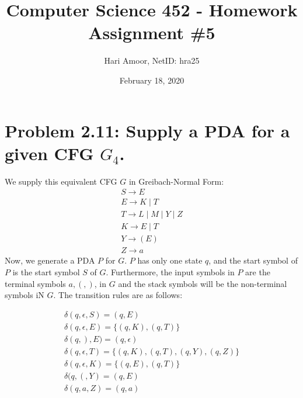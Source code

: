 \documentclass[12pt]{article}
\title{Computer Science 452 - Homework Assignment \#5}
\author{Hari Amoor, NetID: hra25}
\date{February 18, 2020}
\begin{document}
\maketitle

\section*{Problem 2.11: Supply a PDA for a given CFG $G_{4}$.}
We supply this equivalent CFG $G$ in Greibach-Normal Form:
\begin{align*}
  S \rightarrow E \nonumber \\
  E \rightarrow K \mid T \nonumber \\
  T \rightarrow L \mid M \mid Y \mid Z \nonumber \\
  K \rightarrow E \mid T \nonumber \\
  Y \rightarrow (E) \nonumber \\
  Z \rightarrow a \nonumber
\end{align*}
Now, we generate a PDA $P$ for $G$. $P$ has only one state $q$, and the start symbol of $P$ is the start symbol $S$ of $G$. Furthermore, the input symbols in $P$ are the terminal symbols $a, (, )$, in $G$ and the stack symbols will be the non-terminal symbols iN $G$. The transition rules are as follows:

\begin{align*}
  \delta(q, \epsilon, S) = (q, E) \nonumber \\
  \delta(q, \epsilon, E) = \{(q, K), (q, T)\} \nonumber \\
  \delta(q, ), E) = (q, \epsilon) \nonumber \\
  \delta(q, \epsilon, T) = \{(q, K), (q, T), (q, Y), (q, Z)\} \nonumber \\
  \delta(q, \epsilon, K) = \{(q, E), (q, T)\} \nonumber \\
  \delta(q, (, Y) = (q, E) \nonumber \\
  \delta(q, a, Z) = (q, a) \nonumber
\end{align*}
\end{document}
